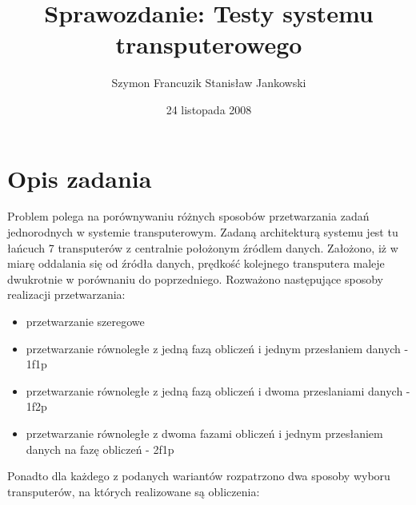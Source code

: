 \documentclass[a4paper,11pt, titlepage]{article}
\title{Sprawozdanie: Testy systemu transputerowego}
\author{Szymon Francuzik Stanisław Jankowski}
\date{24 listopada 2008}
\begin{document}
\maketitle
\section{Opis zadania}
Problem polega na porównywaniu różnych sposobów przetwarzania zadań jednorodnych w systemie transputerowym. Zadaną architekturą systemu jest tu łańcuch 7 transputerów z centralnie położonym źródlem danych. Założono, iż w miarę oddalania się od źródła danych, prędkość kolejnego transputera maleje dwukrotnie w porównaniu do poprzedniego. Rozważono następujące sposoby realizacji przetwarzania:
\begin{itemize}
\item przetwarzanie szeregowe
\item przetwarzanie równoległe z jedną fazą obliczeń i jednym przesłaniem danych - 1f1p
\item przetwarzanie równoległe z jedną fazą obliczeń i dwoma przeslaniami danych - 1f2p
\item przetwarzanie równoległe z dwoma fazami obliczeń i jednym przesłaniem danych na fazę obliczeń - 2f1p
\end{itemize}
Ponadto dla każdego z podanych wariantów rozpatrzono dwa sposoby wyboru transputerów, na których realizowane są obliczenia:
\end{document}
